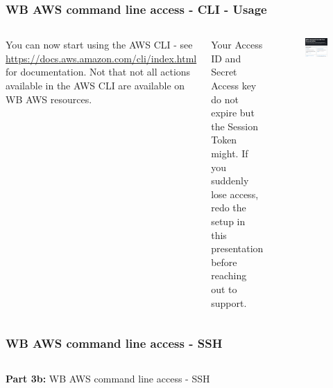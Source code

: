 \documentclass[aspectratio=169]{beamer} %
\begin{document}
\begin{frame}
	\frametitle{WB AWS command line access - CLI - Usage}
	\begin{columns}[c]
		
		You can now start using the AWS CLI - see
		\url{https://docs.aws.amazon.com/cli/index.html}
		for documentation. 
		Not that not all actions available in the AWS CLI 
		are available on WB AWS resources.
		
		\vspace{.5cm}
		
		Your Access ID and Secret Access key do not expire
		but the Session Token might.
		If you suddenly lose access, 
		redo the setup in this presentation before
		reaching out to support.

		
		\begin{figure}
			\centering
			\includegraphics[width=1\textwidth]{./img/aws-cli-documentation.png}
		\end{figure}
		
	\end{columns}
\end{frame}

\begin{frame}
	\frametitle{WB AWS command line access - SSH}
	\begin{columns}[c]
		
		
		\textbf{Part 3b:} WB AWS command line access - SSH
		
	\end{columns}
\end{frame}
\end{document}
